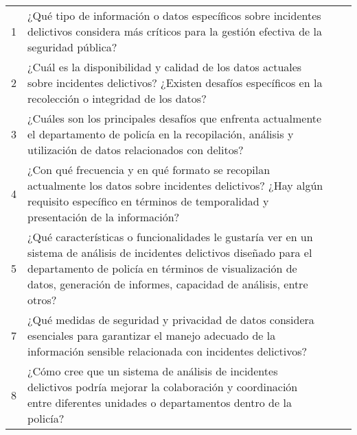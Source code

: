 \begin{longtable}{|l|p{5.9cm}|p{4cm}|p{4cm}|}
    1                                        & ¿Qué tipo de información o datos específicos sobre incidentes delictivos considera más críticos para la gestión efectiva de la seguridad pública?                                                                                                     &                                         &                                           \\
    2                                        & ¿Cuál es la disponibilidad y calidad de los datos actuales sobre incidentes delictivos? ¿Existen desafíos específicos en la recolección o integridad de los datos?                                                                                    &                                         &                                           \\
    3                                        & ¿Cuáles son los principales desafíos que enfrenta actualmente el departamento de policía en la recopilación, análisis y utilización de datos relacionados con delitos?                                                                                &                                         &                                           \\
    4                                        & ¿Con qué frecuencia y en qué formato se recopilan actualmente los datos sobre incidentes delictivos? ¿Hay algún requisito específico en términos de temporalidad y presentación de la información?                                                    &                                         &                                           \\
    5                                        & ¿Qué características o funcionalidades le gustaría ver en un sistema de análisis de incidentes delictivos diseñado para el departamento de policía en términos de visualización de datos, generación de informes, capacidad de análisis, entre otros? &                                         &                                           \\
    7                                        & ¿Qué medidas de seguridad y privacidad de datos considera esenciales para garantizar el manejo adecuado de la información sensible relacionada con incidentes delictivos?                                                                             &                                         &                                           \\
    8                                        & ¿Cómo cree que un sistema de análisis de incidentes delictivos podría mejorar la colaboración y coordinación entre diferentes unidades o departamentos dentro de la policía?                                                                          &                                         &                                           \\

\end{longtable}

